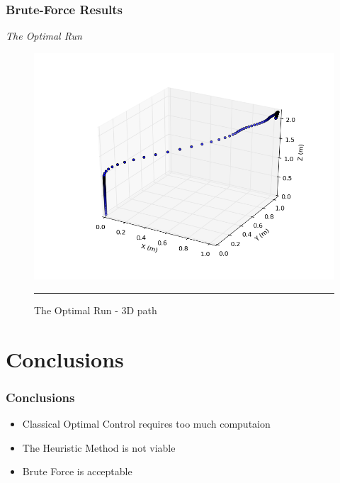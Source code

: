 \documentclass{beamer}
\begin{document}
\begin{frame}

\frametitle{Brute-Force Results}

\textit{The Optimal Run}
\begin{figure}[htbp]
	\centering
		\includegraphics[width=\textwidth]{Figures/optimal_run_3D_path.png}
		\rule{35em}{0.5pt}
	\caption[optimal run 3D path]{The Optimal Run - 3D path}
	\label{fig:optimal run 3D path}
\end{figure}

\end{frame}




\section{Conclusions}%


\begin{frame}

\frametitle{Conclusions}
\begin{itemize}
\item Classical Optimal Control requires too much computaion
\item The Heuristic Method is not viable
\item Brute Force is acceptable

\end{itemize}
\end{frame}
\end{document}
